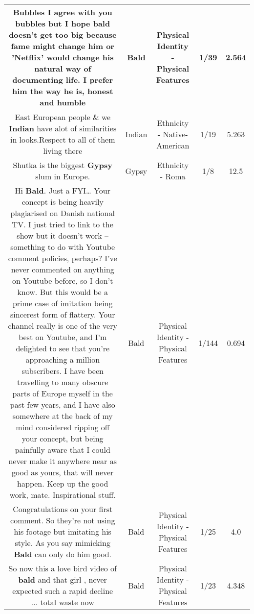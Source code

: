 \documentclass[11pt]{article}
\newlength\mylength
\begin{document}
\begin{center}
\begin{longtable}{|C{.65\mylength}|C{.30\mylength}|C{.12\mylength}|C{.12\mylength}|C{.12\mylength}|}
  \small Bubbles I agree with you bubbles but I hope \textbf{bald} doesn't get too big because fame might change him or 'Netflix' would change his natural way of documenting life. I prefer him the way he is, honest and humble\normalsize   & Bald & Physical Identity - Physical Features & 1/39 & 2.564 \\  \hline
  \small East European people \& we \textbf{Indian} have    alot of similarities in looks.Respect to all of them living there\normalsize   & Indian & Ethnicity - Native-American & 1/19 & 5.263 \\  \hline
  \small Shutka is the biggest \textbf{Gypsy} slum in Europe.\normalsize   & Gypsy & Ethnicity - Roma & 1/8 & 12.5 \\  \hline
  \small Hi \textbf{Bald}. Just a FYI… Your concept is being heavily plagiarised on Danish national TV. I just tried to link to the show but it doesn't work – something to do with Youtube comment policies, perhaps? I've never commented on anything on Youtube before, so I don't know. But this would be a prime case of imitation being sincerest form of flattery. Your channel really is one of the very best on Youtube, and I'm delighted to see that you're approaching a million subscribers. I have been travelling to many obscure parts of Europe myself in the past few years, and I have also somewhere at the back of my mind considered ripping off your concept, but being painfully aware that I could never make it anywhere near as good as yours, that will never happen. Keep up the good work, mate. Inspirational stuff.\normalsize   & Bald & Physical Identity - Physical Features & 1/144 & 0.694 \\  \hline
  \small Congratulations on your first comment. So they're not using his footage but imitating his style. As you say mimicking \textbf{Bald} can only do him good.\normalsize   & Bald & Physical Identity - Physical Features & 1/25 & 4.0 \\  \hline
  \small So now this a love bird video of \textbf{bald} and that girl , never expected such a rapid decline ... total waste now\normalsize   & Bald & Physical Identity - Physical Features & 1/23 & 4.348 \\  \hline

\end{longtable}
\end{center}
\end{document}
